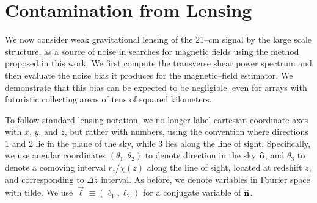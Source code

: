 \section{Contamination from Lensing}

We now consider weak gravitational lensing of the 21--cm signal by the large scale structure, as a source of noise in searches for magnetic fields using the method proposed in this work. We first compute the transverse shear power spectrum and then evaluate the noise bias it produces for the magnetic--field estimator. We demonstrate that this bias can be expected to be negligible, even for arrays with futuristic collecting areas of tens of squared kilometers.

To follow standard lensing notation, we no longer label cartesian coordinate axes with $x$, $y$, and $z$, but rather with numbers, using the convention where directions $1$ and $2$ lie in the plane of the sky, while $3$ lies along the line of sight. Specifically, we use angular coordinates $(\theta_1, \theta_2)$ to denote direction in the sky ${\bf{\widehat n}}$, and $\theta_3$ to denote a comoving interval $r_z/\chi(z)$ along the line of sight, located at redshift $z$, and corresponding to $\Delta z$ interval. As before, we denote variables in Fourier space with tilde. We use $\vec{\ell}\equiv(\ell_1,\ell_2)$ for a conjugate variable of ${\bf{\widehat n}}$. 
 
